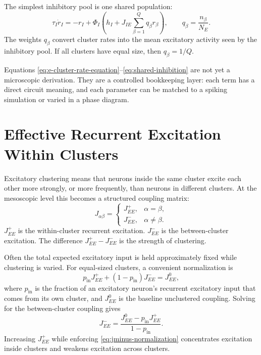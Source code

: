 The simplest inhibitory pool is one shared population:
%
\begin{equation}
  \tau_I \dot r_I
  =
  -r_I
  +
  \Phi_I\!\left(
    h_I + J_{IE}\sum_{\beta=1}^{Q} q_{\beta} r_{\beta}
  \right),
  \qquad
  q_{\beta}=\frac{n_{\beta}}{N_E}.
  \label{eq:shared-inhibition}
\end{equation}
%
The weights $q_{\beta}$ convert cluster rates into the mean excitatory activity seen by the inhibitory pool. If all clusters have equal size, then $q_{\beta}=1/Q$.

Equations \eqref{eq:e-cluster-rate-equation}--\eqref{eq:shared-inhibition} are not yet a microscopic derivation. They are a controlled bookkeeping layer: each term has a direct circuit meaning, and each parameter can be matched to a spiking simulation or varied in a phase diagram.

\section{Effective Recurrent Excitation Within Clusters}
\label{sec:effective-recurrent-excitation-within-clusters}

Excitatory clustering means that neurons inside the same cluster excite each other more strongly, or more frequently, than neurons in different clusters. At the mesoscopic level this becomes a structured coupling matrix:
%
\begin{equation}
  J_{\alpha\beta}
  =
  \begin{cases}
    J_{EE}^{+}, & \alpha=\beta,\\
    J_{EE}^{-}, & \alpha\ne\beta.
  \end{cases}
  \label{eq:e-cluster-coupling}
\end{equation}
%
$J_{EE}^{+}$ is the within-cluster recurrent excitation. $J_{EE}^{-}$ is the between-cluster excitation. The difference $J_{EE}^{+}-J_{EE}^{-}$ is the strength of clustering.

Often the total expected excitatory input is held approximately fixed while clustering is varied. For equal-sized clusters, a convenient normalization is
%
\begin{equation}
  p_{\mathrm{in}} J_{EE}^{+}
  +
  (1-p_{\mathrm{in}})J_{EE}^{-}
  =
  J_{EE}^{0},
  \label{eq:fixed-mean-excitation}
\end{equation}
%
where $p_{\mathrm{in}}$ is the fraction of an excitatory neuron's recurrent excitatory input that comes from its own cluster, and $J_{EE}^{0}$ is the baseline unclustered coupling. Solving for the between-cluster coupling gives
%
\begin{equation}
  J_{EE}^{-}
  =
  \frac{J_{EE}^{0}-p_{\mathrm{in}}J_{EE}^{+}}{1-p_{\mathrm{in}}}.
  \label{eq:jminus-normalization}
\end{equation}
%
Increasing $J_{EE}^{+}$ while enforcing \eqref{eq:jminus-normalization} concentrates excitation inside clusters and weakens excitation across clusters.

